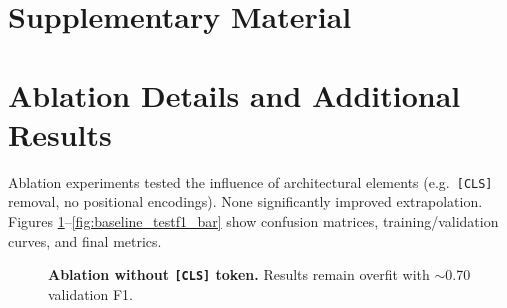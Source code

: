 \documentclass{article} %
\begin{document}
\clearpage



\appendix

\section*{\LARGE Supplementary Material}

\section{Ablation Details and Additional Results}
\label{appendix:ablations}
Ablation experiments tested the influence of architectural elements (e.g.\ \texttt{[CLS]} removal, no positional encodings). None significantly improved extrapolation. Figures \ref{fig:app_clstoken}--\ref{fig:baseline_testf1_bar} show confusion matrices, training/validation curves, and final metrics.

\begin{figure}[h]
\centering
{}
\caption{\textbf{Ablation without \texttt{[CLS]} token.} Results remain overfit with $\sim$0.70 validation F1.}
\label{fig:app_clstoken}
\end{figure}
\end{document}
